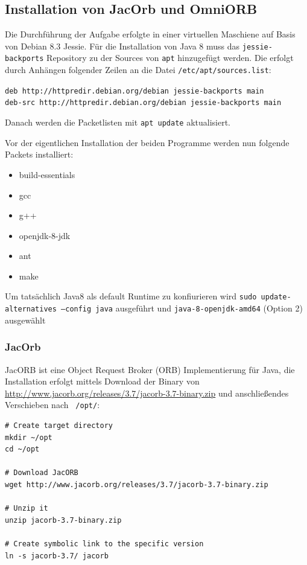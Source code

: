 \subsection{Installation von JacOrb\cite{jacorb} und OmniORB\cite{omniorb}}
Die Durchf\"uhrung der Aufgabe erfolgte in einer virtuellen Maschiene auf Basis von Debian 8.3 Jessie.
F\"ur die Installation von Java 8 muss das \texttt{jessie-backports} Repository zu der Sources von \texttt{apt} hinzugef\"ugt werden.
Die erfolgt durch Anh\"angen folgender Zeilen an die Datei \texttt{/etc/apt/sources.list}:

\texttt{deb http://httpredir.debian.org/debian jessie-backports main\\
deb-src http://httpredir.debian.org/debian jessie-backports main}

Danach werden die Packetlisten mit \texttt{apt update} aktualisiert.

Vor der eigentlichen Installation der beiden Programme werden nun folgende Packets installiert:
\begin{itemize}
    \item build-essentials
    \item gcc
    \item g++
    \item openjdk-8-jdk
    \item ant
    \item make
\end{itemize}

Um tats\"achlich Java8 als default Runtime zu konfiurieren wird \texttt{sudo update-alternatives --config java} ausgef\"uhrt und \texttt{java-8-openjdk-amd64} (Option 2) ausgew\"ahlt

\subsubsection{JacOrb}
JacORB ist eine Object Request Broker (ORB) Implementierung f\"ur Java, die Installation erfolgt mittels Download der Binary von \url{http://www.jacorb.org/releases/3.7/jacorb-3.7-binary.zip} und anschlie\ss endes Verschieben nach \texttt{~/opt/}:
\begin{lstlisting}[caption=Installation von JacORB]
# Create target directory
mkdir ~/opt
cd ~/opt

# Download JacORB
wget http://www.jacorb.org/releases/3.7/jacorb-3.7-binary.zip

# Unzip it
unzip jacorb-3.7-binary.zip

# Create symbolic link to the specific version
ln -s jacorb-3.7/ jacorb
\end{lstlisting}

